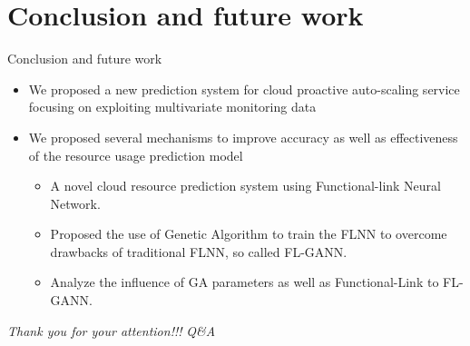 \documentclass{beamer}
\begin{document}
\section{Conclusion and future work}
\begin{frame}{Conclusion and future work}
	\begin{itemize}
		\item {
		We proposed a new prediction system for cloud proactive auto-scaling service focusing on exploiting multivariate monitoring data
		}
		\item{
			We proposed several mechanisms to improve accuracy as well as effectiveness of the resource usage prediction model}
		\begin{itemize}
			\item {
				A novel cloud resource prediction system using Functional-link Neural Network.
			}
			\item {
				Proposed the use of Genetic Algorithm to train the FLNN to overcome drawbacks of traditional FLNN, so called FL-GANN.
			}
			\item{
				Analyze the influence of GA parameters as well as Functional-Link to FL-GANN.
			}
		\end{itemize}
	\end{itemize}
\end{frame}

\begin{frame}{}
	
		\centering \Huge
		\emph{Thank you for your attention!!!}
		\emph{Q\&A}
			
		
\end{frame}
%
%
\end{document}

